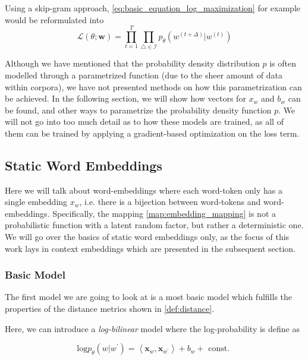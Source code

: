 \documentclass[a4paper,12pt,twoside,openright]{report}
\begin{document}
Using a skip-gram approach, \eqref{eq:basic_equation_log_maximization} for example would be reformulated into 
\begin{equation}
\mathcal{L}(\theta ; \mathbf{w})=\prod_{t=1}^{T} \prod_{\triangle \in \mathcal{I}} p_{\theta}\left(w^{(t +\Delta)} | w^{(t)}\right)
\end{equation}{\label{eq:basic_equation_log_maximization_skipgram}}

Although we have mentioned that the probability density distribution $p$ is often modelled through a parametrized function (due to the sheer amount of data within corpora), we have not presented methods on how this parametrization can be achieved.
In the following section, we will show how vectors for $x_w$ and $b_w$ can be found, and other ways to parametrize the probability density function $p$.
We will not go into too much detail as to how these models are trained, as all of them can be trained by applying a gradient-based optimization on the loss term.

\newpage
\subsection{Static Word Embeddings}

Here we will talk about word-embeddings where each word-token only has a single embedding $x_w$, i.e. there is a bijection between word-tokens and word-embeddings. 
Specifically, the mapping \eqref{map:embedding_mapping} is not a probabilistic function with a latent random factor, but rather a deterministic one.
We will go over the basics of static word embeddings only, as the focus of this work lays in context embeddings which are presented in the subsequent section.

\subsubsection{Basic Model}

The first model we are going to look at is a most basic model which fulfills the properties of the distance metrics shown in \eqref{def:distance}.

Here, we can introduce a \textit{log-bilinear} \cite{cil_slides} model where the log-probability is define as

\begin{equation}
\text{log} p_{\theta}(w | w^{\prime}) = \left\langle\mathbf{x}_{w}, \mathbf{x}_{w^{\prime}}\right\rangle+b_{w} + \text { const. }
\end{equation}
\end{document}
